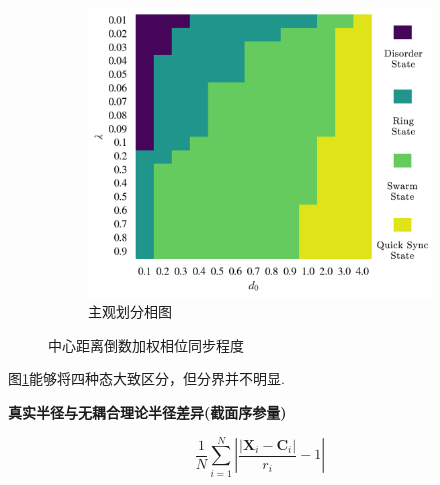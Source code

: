 \documentclass{article}
\begin{document}
\begin{figure}[H]
\begin{subfigure}[b]{0.49\textwidth}
	\end{subfigure}
	\begin{subfigure}[b]{0.49\textwidth}
		\includegraphics[width=\textwidth]{./figs/subjectiveOp.png}
		\vspace{-1cm}
		\caption{主观划分相图}
	\end{subfigure}
	\vspace{-0.5cm}
	\caption{中心距离倒数加权相位同步程度}
	\label{fig:fig234c.6}
\end{figure}

\vspace{-0.5cm}
图\ref{fig:fig234c.6}能够将四种态大致区分，但分界并不明显.

\noindent\textbf{真实半径与无耦合理论半径差异(截面序参量)}

$$
\frac{1}{N}\sum_{i=1}^N{\left| \frac{\left| \mathbf{X}_i-\mathbf{C}_i \right|}{r_i}-1 \right|}
$$
\end{document}
